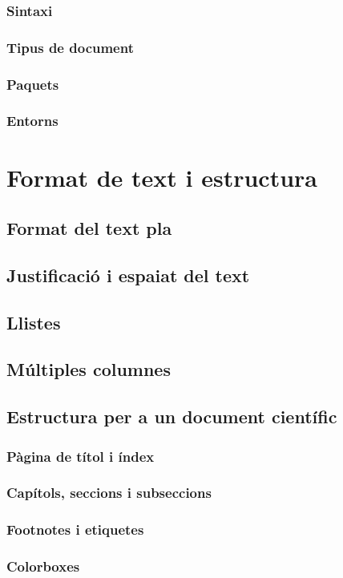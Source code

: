 \documentclass[15pt,twosides,onecolumn,openany]{book}
\begin{document}
\subsection{Sintaxi}
\subsection{Tipus de document}
\subsection{Paquets}
\subsection{Entorns}

\chapter{Format de text i estructura}
\thispagestyle{empty}
\section{Format del text pla}
\section{Justificació i espaiat del text}
\section{Llistes}
\section{Múltiples columnes}
\section{Estructura per a un document científic}
\subsection{Pàgina de títol i índex}
\subsection{Capítols, seccions i subseccions}
\subsection{Footnotes i etiquetes}
\subsection{Colorboxes}
\end{document}
